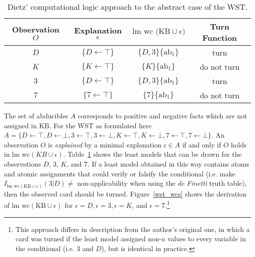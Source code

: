 \begin{table}
\begin{center}


\begin{tabular}{ c c c c }
  \textbf{Observation $O$}&  \textbf{Explanation $\epsilon$}&\textbf{$\text{lm wc (KB}\cup \epsilon)$}& \textbf{Turn Function} \\ 
  \hline
 $D$ & $\{D\leftarrow \top\}$ & $\{D,3\}\{\text{ab}_1\}$&turn\\  
 $K$ & $\{K\leftarrow \top\}$ & $\{K\}\{\text{ab}_1\}$&do not turn\\  
 $3$ & $\{D\leftarrow\top\}$ &$\{D,3\}\{\text{ab}_1\}$&turn\\
 $7$ & $\{7 \leftarrow \top\}$ & $\{7\}\{\text{ab}_1\}$&do not turn
\end{tabular}
\caption{Dietz' computational logic approach to the abstract case of the WST.}
\label{tbl:wst_lmwc}
\end{center}
\end{table}

The set of abducibles $A$ corresponds to positive and negative facts which are not assigned in $\text{KB}$. For the WST as formulated here $A=\{D\leftarrow \top,D\leftarrow \bot,3\leftarrow \top,3\leftarrow \bot,K\leftarrow \top,K\leftarrow \bot,7\leftarrow \top,7\leftarrow \bot\}$.
 An observation $O$ is \textit{explained} by a minimal explanation $\epsilon \in A$ if and only if $O$ holds in $\textrm{lm wc}(KB\cup\epsilon)$. Table~\ref{tbl:wst_lmwc} shows the least models that can be drawn for the observations $D$, $3$, $K$, and $7$. If a least model obtained in this way contains atoms and atomic assignments that could verify or falsify the conditional (i.e. make $I_{\textrm{lm wc}(\text{KB}\cup \epsilon)}(3|D)\neq$ non-applicability when using the \textit{de Finetti} truth table), then the observed card should be turned. Figure~\ref{wst_wcs} shows the derivation of $\textrm{lm wc}(\text{KB}\cup \epsilon)$ for $\epsilon=D, \epsilon=3, \epsilon=K$, and $\epsilon=7$.\footnote{This approach differs in description from the author's original one, in which a card was turned if the least model assigned non-$u$ values to every variable in the conditional (i.e. $3$ and $D$), but is identical in practice.}


